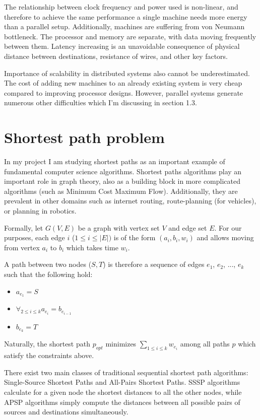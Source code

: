 \documentclass[12pt,a4paper,oneside,openright]{report}
\begin{document}
The relationship between clock frequency and power used is non-linear, and therefore to achieve the same performance a single machine needs more energy than a parallel setup. Additionally, machines are suffering from von Neumann bottleneck. The processor and memory are separate, with data moving frequently between them. Latency increasing is an unavoidable consequence of physical distance between destinations, resistance of wires, and other key factors. 

Importance of scalability in distributed systems also cannot be underestimated. The cost of adding new machines to an already existing system is very cheap compared to improving processor designs. 
However, parallel systems generate numerous other difficulties which I'm discussing in section 1.3.

\section{Shortest path problem}
In my project I am studying shortest paths as an important example of fundamental computer science algorithms. Shortest paths algorithms play an important role in graph theory, also as a building block in more complicated algorithms (such as Minimum Cost Maximum Flow). Additionally, they are prevalent in other domains such as internet routing, route-planning (for vehicles), or planning in robotics. 

Formally, let $G(V,E)$ be a graph with vertex set $V$ and edge set $E$. For our purposes, each edge $i$ ($1\leq i\leq |E|)$ is of the form $(a_i, b_i, w_i)$ and allows moving from vertex $a_i$ to $b_i$ which takes time $w_i$. 

A path between two nodes ($S, T$) is therefore a sequence of edges $e_1$, $e_2$, ..., $e_k$ such that the following hold:
\begin{itemize}
    \item $a_{e_1} = S$
    \item $\displaystyle\mathop{\forall}_{2\leq i \leq k} a_{e_{i}} = b_{e_{i-1}}$
    \item $b_{e_k} = T$
\end{itemize}

Naturally, the shortest path $p_{opt}$ minimizes $\displaystyle\mathop{\sum}_{1\leq i \leq k} w_{e_i}$ among all paths $p$ which satisfy the constraints above.

There exist two main classes of traditional sequential shortest path algorithms: Single-Source Shortest Paths and All-Pairs Shortest Paths. SSSP algorithms calculate for a given node the shortest distances to all the other nodes, while APSP algorithms simply compute the distances between all possible pairs of sources and destinations simultaneously.
\end{document}
